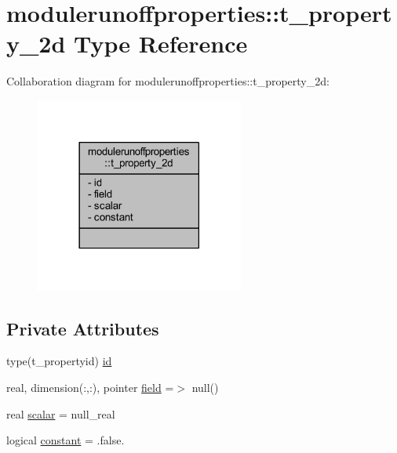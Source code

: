 \hypertarget{structmodulerunoffproperties_1_1t__property__2d}{}\section{modulerunoffproperties\+:\+:t\+\_\+property\+\_\+2d Type Reference}
\label{structmodulerunoffproperties_1_1t__property__2d}


Collaboration diagram for modulerunoffproperties\+:\+:t\+\_\+property\+\_\+2d\+:\nopagebreak
\begin{figure}[H]
\begin{center}
\leavevmode
\includegraphics[width=194pt]{structmodulerunoffproperties_1_1t__property__2d__coll__graph}
\end{center}
\end{figure}
\subsection*{Private Attributes}
\begin{DoxyCompactItemize}
\item 
type(t\+\_\+propertyid) \mbox{\hyperlink{structmodulerunoffproperties_1_1t__property__2d_a0bd59fbbc587281eb068ec00a3668634}{id}}
\item 
real, dimension(\+:,\+:), pointer \mbox{\hyperlink{structmodulerunoffproperties_1_1t__property__2d_a54654dbf483cdf7d317041246892d138}{field}} =$>$ null()
\item 
real \mbox{\hyperlink{structmodulerunoffproperties_1_1t__property__2d_aaaa6236ca355bc5cf32d51531fcce2e1}{scalar}} = null\+\_\+real
\item 
logical \mbox{\hyperlink{structmodulerunoffproperties_1_1t__property__2d_a535f2abe46c5118a15e5a9c4cdcb63ce}{constant}} = .false.
\end{DoxyCompactItemize}


